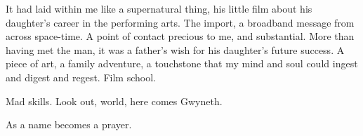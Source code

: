 

﻿It had laid within me like a supernatural thing, his little film about
his daughter's career in the performing arts.  The import, a broadband
message from across space-time.  A point of contact precious to me,
and substantial.  More than having met the man, it was a father's wish
for his daughter's future success.  A piece of art, a family
adventure, a touchstone that my mind and soul could ingest and digest
and regest.  Film school.


Mad skills.  Look out, world, here comes Gwyneth.


As a name becomes a prayer.

\bye
